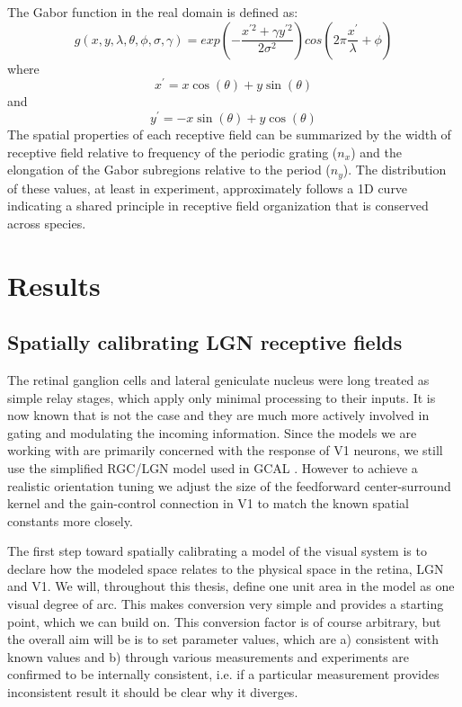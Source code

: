 The Gabor function in the real domain is defined as:
\begin{equation}
  g(x, y, \lambda, \theta, \phi, \sigma, \gamma) = exp(-\frac{x^{\prime 2} + \gamma y^{\prime 2}}{2\sigma^2}) cos(2 \pi \frac{x^\prime}{\lambda}+\phi)
\end{equation}
where
\begin{equation}
  x^\prime = x\cos(\theta) + y\sin(\theta)
\end{equation}
and
\begin{equation}
y^\prime = -x\sin(\theta) + y\cos(\theta)
\end{equation}
The spatial properties of each receptive field can be summarized by
the width of receptive field relative to frequency of the periodic
grating ($n_x$) and the elongation of the Gabor subregions relative to
the period ($n_y$). The distribution of these values, at least in
experiment, approximately follows a 1D curve indicating a shared
principle in receptive field organization that is conserved across
species.

\section{Results}

\subsection{Spatially calibrating LGN receptive fields}

The retinal ganglion cells and lateral geniculate nucleus were long
treated as simple relay stages, which apply only minimal processing to
their inputs. It is now known that is not the case and they are much
more actively involved in gating and modulating the incoming
information. Since the models we are working with are primarily
concerned with the response of V1 neurons, we still use the simplified
RGC/LGN model used in GCAL \citep{Stevens2013}. However to achieve a
realistic orientation tuning we adjust the size of the feedforward
center-surround kernel and the gain-control connection in V1 to match
the known spatial constants more closely.

The first step toward spatially calibrating a model of the visual
system is to declare how the modeled space relates to the physical
space in the retina, LGN and V1. We will, throughout this thesis,
define one unit area in the model as one visual degree of arc. This
makes conversion very simple and provides a starting point, which we
can build on. This conversion factor is of course arbitrary, but the
overall aim will be is to set parameter values, which are a)
consistent with known values and b) through various measurements and
experiments are confirmed to be internally consistent, i.e. if a
particular measurement provides inconsistent result it should be clear
why it diverges.

